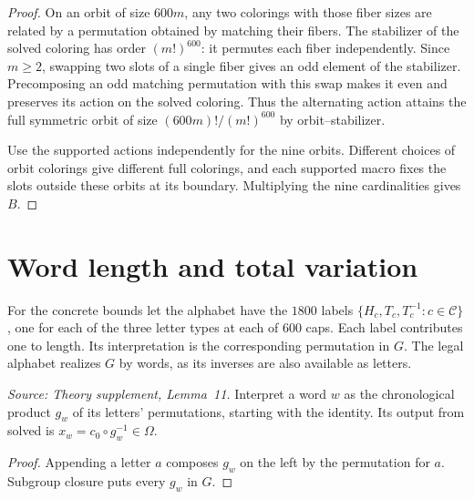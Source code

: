 %
%
\begin{proof}
  \leanok
  On an orbit of size \(600m\), any two colorings with those fiber sizes
  are related by a permutation obtained by matching their fibers.
  The stabilizer of the solved coloring has order \((m!)^{600}\):
  it permutes each fiber independently. Since \(m\ge 2\), swapping two
  slots of a single fiber gives an odd element of the stabilizer.
  Precomposing an odd matching permutation with this swap makes it
  even and preserves its action on the solved coloring. Thus the
  alternating action attains the full symmetric orbit of size
  \((600m)!/(m!)^{600}\) by orbit--stabilizer.

  Use the supported actions independently for the nine orbits. Different
  choices of orbit colorings give different full colorings, and each
  supported macro fixes the slots outside these orbits at its boundary.
  Multiplying the nine cardinalities gives \(B\).
\end{proof}

\section{Word length and total variation}

For the concrete bounds let the alphabet have the \(1800\) labels
\(\{H_c,T_c,T_c^{-1}:c\in\mathcal C\}\), one for each of the three
letter types at each of \(600\) caps. Each label contributes one to
length. Its interpretation is the corresponding permutation in \(G\).
The legal alphabet realizes \(G\) by words, as its inverses are also
available as letters.

\begin{definition}
  \label{def:word-coloring}
  \leanok
  \textit{Source: Theory supplement, Lemma~11.}
  Interpret a word \(w\) as the chronological product \(g_w\) of its
  letters' permutations, starting with the identity. Its output from
  solved is \(x_w=c_0\circ g_w^{-1}\in\Omega\).
\end{definition}
\begin{proof}
  \leanok
  Appending a letter \(a\) composes \(g_w\) on the left by the
  permutation for \(a\). Subgroup closure puts every \(g_w\) in \(G\).
\end{proof}

